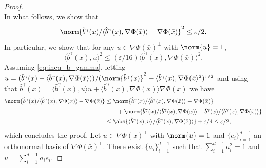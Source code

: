 \begin{proof}
\begin{equation}
	\end{equation}
	In what follows, we show that \begin{equation} \norm{\hat{b}^\gamma(x)/\langle \hat{b}^\gamma(x), \nabla \Phi(\bar{x}) \rangle - \nabla \Phi(\bar{x})}^2 \leq \varepsilon/2 .
	\end{equation}
	In particular, we show that for any $u \in \nabla \Phi(\bar{x})^\perp$ with $\norm{u}=1$, \begin{equation} \label{eq:ineq_b_gamma} \langle \hat{b}^\gamma(x), u \rangle ^2 \leq (\varepsilon/16) \langle \hat{b}^\gamma(x), \nabla \Phi(\bar{x}) \rangle^2.
	\end{equation}
	Assuming \eqref{eq:ineq_b_gamma}, letting $u = (\hat{b}^\gamma(x) - \langle \hat{b}^\gamma(x), \nabla \Phi(\bar{x} \rangle)) / (\norm{\hat{b}^\gamma(x)}^2 - \langle \hat{b}^\gamma(x), \nabla \Phi(\bar{x} \rangle^2)^{1/2}$ and using that $\hat{b}^\gamma(x) = \langle \hat{b}^\gamma(x), u\rangle u + \langle \hat{b}^\gamma(x), \nabla \Phi(\bar{x}) \rangle \nabla \Phi(\bar{x})$ we have \begin{align} \norm{\hat{b}^\gamma(x) / \langle \hat{b}^\gamma(x), \nabla \Phi(x) \rangle - \nabla \Phi(\bar{x})} &\leq \norm{\hat{b}^\gamma(x) / \langle \hat{b}^\gamma(x), \nabla \Phi(\bar{x}) \rangle - \nabla \Phi(\bar{x})} \\ & \qquad + \norm{\hat{b}^\gamma(x) / \langle \hat{b}^\gamma(x), \nabla \Phi(x) \rangle - \hat{b}^\gamma(x) / \langle \hat{b}^\gamma(x), \nabla \Phi(\bar{x})\rangle} \\ &\leq \abs{\langle \hat{b}^\gamma(x), u\rangle / \langle \hat{b}^\gamma(x), \nabla \Phi(\bar{x}) \rangle} + \varepsilon / 4 \leq \varepsilon / 2 , \end{align} which concludes the proof.
	Let $u \in \nabla \Phi(\bar{x})^\perp$ with $\norm{u}=1$ and $\{e_i \}_{i=1}^{d-1}$ an orthonormal basis of $\nabla \Phi(\bar{x})^\perp$.
	There exist $\{a_i\}_{i=1}^{d-1}$ such that $\sum_{i=1}^{d-1} a_i^2 = 1$ and $u = \sum_{i=1}^{d-1} a_i e_i$.

\end{proof}
